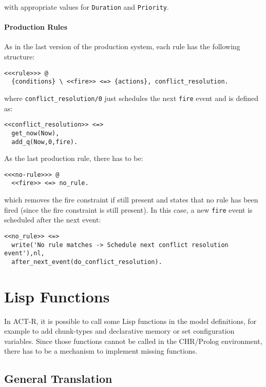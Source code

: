 with appropriate values for \lstinline|Duration| and \lstinline|Priority|.

\paragraph{Production Rules}

As in the last version of the production system, each rule has the following structure:

\begin{lstlisting}
<<<rule>>> @
  {conditions} \ <<fire>> <=> {actions}, conflict_resolution.
\end{lstlisting}

where \lstinline|conflict_resolution/0| just schedules the next \lstinline|fire| event and is defined as:

\begin{lstlisting}
<<conflict_resolution>> <=> 
  get_now(Now),
  add_q(Now,0,fire).
\end{lstlisting}

As the last production rule, there has to be:

\begin{lstlisting}
<<<no-rule>>> @ 
  <<fire>> <=> no_rule.
\end{lstlisting}

which removes the fire constraint if still present and states that no rule has been fired (since the fire constraint is still present). In this case, a new \lstinline|fire| event is scheduled after the next event:

\begin{lstlisting}
<<no_rule>> <=> 
  write('No rule matches -> Schedule next conflict resolution event'),nl,
  after_next_event(do_conflict_resolution).
\end{lstlisting}

\section{Lisp Functions}
\label{lisp_functions}

In ACT-R, it is possible to call some Lisp functions in the model definitions, for example to add chunk-types and declarative memory or set configuration variables. Since those functions cannot be called in the CHR/Prolog environment, there has to be a mechanism to implement missing functions.

\subsection{General Translation}

